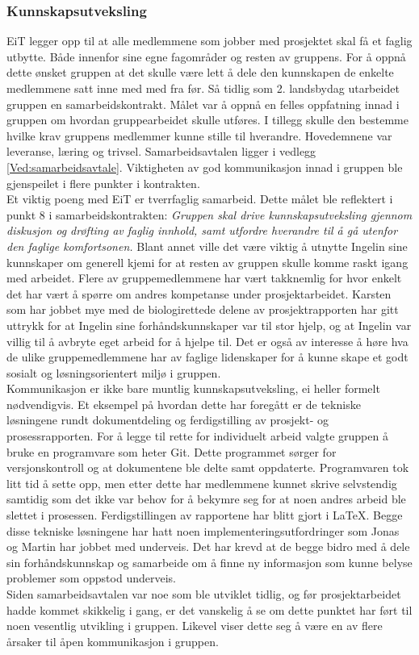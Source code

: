 \subsubsection{Kunnskapsutveksling}
EiT legger opp til at alle medlemmene som jobber med prosjektet skal få et faglig utbytte.
Både innenfor sine egne fagområder og resten av gruppens.
For å oppnå dette ønsket gruppen at det skulle være lett å dele den kunnskapen de enkelte medlemmene satt inne med med fra før.
Så tidlig som 2. landsbydag utarbeidet gruppen en samarbeidskontrakt.
Målet var å oppnå en felles oppfatning innad i gruppen om hvordan gruppearbeidet skulle utføres.
I tillegg skulle den bestemme hvilke krav gruppens medlemmer kunne stille til hverandre.
Hovedemnene var leveranse, læring og trivsel.
Samarbeidsavtalen ligger i vedlegg \ref{Ved:samarbeidsavtale}.
Viktigheten av god kommunikasjon innad i gruppen ble gjenspeilet i flere punkter i kontrakten.
\\
Et viktig poeng med EiT er tverrfaglig samarbeid. Dette målet ble reflektert i punkt 8 i samarbeidskontrakten: \textit{Gruppen skal drive kunnskapsutveksling gjennom diskusjon og drøfting av faglig innhold, samt utfordre hverandre til å gå utenfor den faglige komfortsonen.} Blant annet ville det være viktig å utnytte Ingelin sine kunnskaper om generell kjemi for at resten av gruppen skulle komme raskt igang med arbeidet.
Flere av gruppemedlemmene har vært takknemlig for hvor enkelt det har vært å spørre om andres kompetanse under prosjektarbeidet.
Karsten som har jobbet mye med de biologirettede delene av prosjektrapporten har gitt uttrykk for at Ingelin sine forhåndskunnskaper var til stor hjelp, og at Ingelin var villig til å avbryte eget arbeid for å hjelpe til.
Det er også av interesse å høre hva de ulike gruppemedlemmene har av faglige lidenskaper for å kunne skape et godt sosialt og løsningsorientert miljø i gruppen.
\\
Kommunikasjon er ikke bare muntlig kunnskapsutveksling, ei heller formelt nødvendigvis.
Et eksempel på hvordan dette har foregått er de tekniske løsningene rundt dokumentdeling og ferdigstilling av prosjekt- og prosessrapporten.
For å legge til rette for individuelt arbeid valgte gruppen å bruke en programvare som heter Git.
Dette programmet sørger for versjonskontroll og at dokumentene ble delte samt oppdaterte.
Programvaren tok litt tid å sette opp, men etter dette har medlemmene kunnet skrive selvstendig samtidig som det ikke var behov for å bekymre seg for at noen andres arbeid ble slettet i prosessen.
Ferdigstillingen av rapportene har blitt gjort i \LaTeX.
Begge disse tekniske løsningene har hatt noen implementeringsutfordringer som Jonas og Martin har jobbet med underveis.
Det har krevd at de begge bidro med å dele sin forhåndskunnskap og samarbeide om å finne ny informasjon som kunne belyse problemer som oppstod underveis.
\\
Siden samarbeidsavtalen var noe som ble utviklet tidlig, og før prosjektarbeidet hadde kommet skikkelig i gang, er det vanskelig å se om dette punktet har ført til noen vesentlig utvikling i gruppen.
Likevel viser dette seg å være en av flere årsaker til åpen kommunikasjon i gruppen.
\\